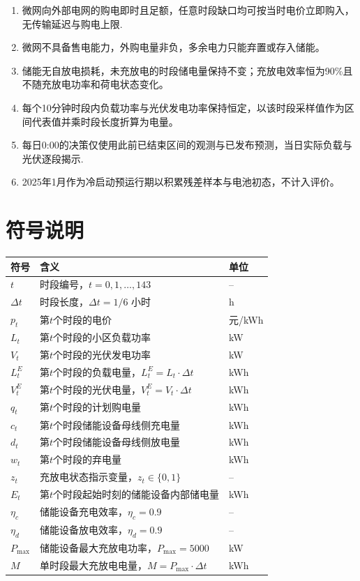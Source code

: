 \documentclass[12pt,a4paper]{ctexart}
\theoremstyle{definition}
\theoremstyle{plain}
\theoremstyle{remark}
\newenvironment{symboltable}
  {\begin{center}\zihao{5}\begin{tabular}{>{\centering\arraybackslash}p{3.5cm} p{7.5cm} >{\centering\arraybackslash}p{1.5cm}}
  \toprule
  \textbf{符号} & \textbf{含义} & \textbf{单位} \\
  \midrule}
  {\bottomrule\end{tabular}\end{center}}
\begin{document}
\begin{enumerate}[label=\arabic*.]
\item 微网向外部电网的购电即时且足额，任意时段缺口均可按当时电价立即购入，无传输延迟与购电上限.
\item 微网不具备售电能力，外购电量非负，多余电力只能弃置或存入储能。
\item 储能无自放电损耗，未充放电的时段储电量保持不变；充放电效率恒为90\%且不随充放电功率和荷电状态变化。
\item 每个10分钟时段内负载功率与光伏发电功率保持恒定，以该时段采样值作为区间代表值并乘时段长度折算为电量。
\item 每日0:00的决策仅使用此前已结束区间的观测与已发布预测，当日实际负载与光伏逐段揭示.
\item 2025年1月作为冷启动预运行期以积累残差样本与电池初态，不计入评价。
\end{enumerate}


\section{符号说明}

\begin{symboltable}
$t$ & 时段编号，$t = 0, 1, \ldots, 143$ & -- \\
$\Delta t$ & 时段长度，$\Delta t = 1/6$ 小时 & h \\
$p_t$ & 第$t$个时段的电价 & 元/kWh \\
$L_t$ & 第$t$个时段的小区负载功率 & kW \\
$V_t$ & 第$t$个时段的光伏发电功率 & kW \\
$L_t^{E}$ & 第$t$个时段的负载电量，$L_t^{E} = L_t \cdot \Delta t$ & kWh \\
$V_t^{E}$ & 第$t$个时段的光伏电量，$V_t^{E} = V_t \cdot \Delta t$ & kWh \\
$q_t$ & 第$t$个时段的计划购电量 & kWh \\
$c_t$ & 第$t$个时段储能设备母线侧充电量 & kWh \\
$d_t$ & 第$t$个时段储能设备母线侧放电量 & kWh \\
$w_t$ & 第$t$个时段的弃电量 & kWh \\
$z_t$ & 充放电状态指示变量，$z_t \in \{0, 1\}$ & -- \\
$E_t$ & 第$t$个时段起始时刻的储能设备内部储电量 & kWh \\
$\eta_c$ & 储能设备充电效率，$\eta_c = 0.9$ & -- \\
$\eta_d$ & 储能设备放电效率，$\eta_d = 0.9$ & -- \\
$P_{\max}$ & 储能设备最大充放电功率，$P_{\max} = 5000$ & kW \\
$M$ & 单时段最大充放电电量，$M = P_{\max} \cdot \Delta t$ & kWh \\
\end{symboltable}
\end{document}
